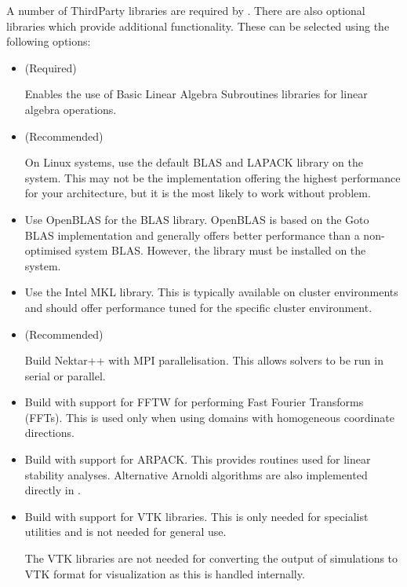 A number of ThirdParty libraries are required by \nekpp. There are also
optional libraries which provide additional functionality. These can be selected
using the following options:
\begin{itemize}
    \item {} (Required)
    
    Enables the use of Basic Linear Algebra Subroutines libraries for linear
    algebra operations.

    \item {} (Recommended)
    
    On Linux systems, use the default BLAS and LAPACK library on the system.
    This may not be the implementation offering the highest performance for your
    architecture, but it is the most likely to work without problem.
    
    \item {}
    
    Use OpenBLAS for the BLAS library. OpenBLAS is based on the Goto BLAS
    implementation and generally offers better performance than a non-optimised
    system BLAS. However, the library must be installed on the system.
    
    \item {}
    
    Use the Intel MKL library. This is typically available on cluster
    environments and should offer performance tuned for the specific cluster
    environment.
    
    \item {} (Recommended)
    
    Build Nektar++ with MPI parallelisation. This allows solvers to be run in
    serial or parallel.
    
    \item {}
    
    Build \nekpp with support for FFTW for performing Fast Fourier Transforms
    (FFTs). This is used only when using domains with homogeneous coordinate
    directions.
    
    \item {}
    
    Build \nekpp with support for ARPACK. This provides routines used for
    linear stability analyses. Alternative Arnoldi algorithms are also
    implemented directly in \nekpp.
    
    \item {}
    
    Build \nekpp with support for VTK libraries. This is only needed for
    specialist utilities and is not needed for general use.
    
    \begin{notebox}
    The VTK libraries are not needed for converting the output of simulations to
    VTK format for visualization as this is handled internally.
    \end{notebox}
\end{itemize}


